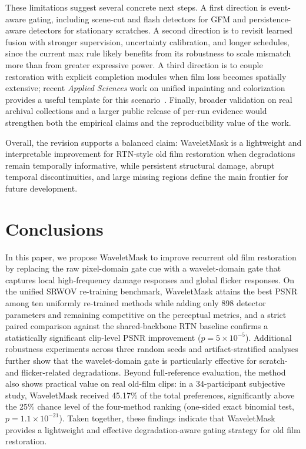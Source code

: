 {These limitations suggest several concrete next steps. A first direction is event-aware gating, including scene-cut and flash detectors for GFM and persistence-aware detectors for stationary scratches. A second direction is to revisit learned fusion with stronger supervision, uncertainty calibration, and longer schedules, since the current max rule likely benefits from its robustness to scale mismatch more than from greater expressive power. A third direction is to couple restoration with explicit completion modules when film loss becomes spatially extensive; recent \textit{Applied Sciences} work on unified inpainting and colorization provides a useful template for this scenario~\cite{yeo2025integration}. Finally, broader validation on real archival collections and a larger public release of per-run evidence would strengthen both the empirical claims and the reproducibility value of the work.

Overall, the revision supports a balanced claim: WaveletMask is a lightweight and interpretable improvement for RTN-style old film restoration when degradations remain temporally informative, while persistent structural damage, abrupt temporal discontinuities, and large missing regions define the main frontier for future development.


\section{Conclusions}\label{sec:conclusions}

In this paper, we propose WaveletMask to improve recurrent old film restoration by replacing the raw pixel-domain gate cue with a wavelet-domain gate that captures local high-frequency damage responses and global flicker responses. On the unified SRWOV re-training benchmark, WaveletMask attains the best PSNR among ten uniformly re-trained methods while adding only 898 detector parameters and remaining competitive on the perceptual metrics, and a strict paired comparison against the shared-backbone RTN baseline confirms a statistically significant clip-level PSNR improvement ($p = 5 \times 10^{-5}$). Additional robustness experiments across three random seeds and artifact-stratified analyses further show that the wavelet-domain gate is particularly effective for scratch- and flicker-related degradations. Beyond full-reference evaluation, the method also shows practical value on real old-film clips: in a 34-participant subjective study, WaveletMask received 45.17\% of the total preferences, significantly above the 25\% chance level of the four-method ranking (one-sided exact binomial test, $p = 1.1 \times 10^{-21}$). Taken together, these findings indicate that WaveletMask provides a lightweight and effective degradation-aware gating strategy for old film restoration.

}
